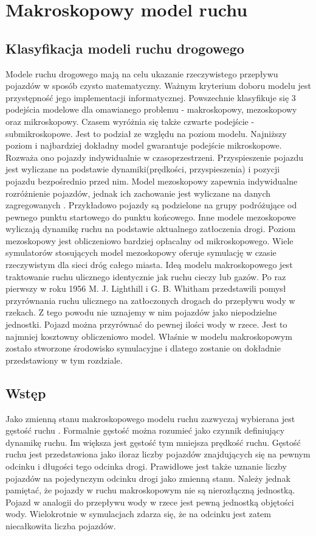 \documentclass[12pt]{book}
\theoremstyle{plain}
\begin{document}
\chapter{Makroskopowy model ruchu} \label{chapter:makroskopowy_model_ruchu}
\section{Klasyfikacja modeli ruchu drogowego}
Modele ruchu drogowego mają na celu ukazanie rzeczywistego przepływu pojazdów w sposób czysto matematyczny. Ważnym kryterium doboru modelu jest przystępność jego implementacji informatycznej. Powszechnie klasyfikuje się 3 podejścia modelowe dla omawianego problemu \cite{CompareModels} - makroskopowy, mezoskopowy oraz mikroskopowy. Czasem \cite{multilevel} wyróżnia się także czwarte podejście - submikroskopowe. Jest to podział ze względu na poziom modelu. Najniższy poziom i najbardziej dokładny model gwarantuje podejście mikroskopowe. Rozważa ono pojazdy indywidualnie w czasoprzestrzeni. Przyspieszenie pojazdu jest wyliczane na podstawie dynamiki(prędkości, przyspieszenia) i pozycji pojazdu bezpośrednio przed nim. Model mezoskopowy zapewnia indywidualne rozróżnienie pojazdów, jednak ich zachowanie jest wyliczane na danych zagregowanych \cite{mesoscopic}. Przykładowo pojazdy są podzielone na grupy podróżujące od pewnego punktu startowego do punktu końcowego. Inne modele \cite{mesoscopic2} mezoskopowe wyliczają dynamikę ruchu na podstawie aktualnego zatłoczenia drogi. Poziom mezoskopowy jest obliczeniowo bardziej opłacalny od mikroskopowego.
Wiele symulatorów stosujących model mezoskopowy oferuje symulację w czasie rzeczywistym dla sieci dróg całego miasta\cite{vu2017high}. Ideą modelu makroskopowego jest traktowanie ruchu ulicznego identycznie jak ruchu cieczy lub gazów. Po raz pierwszy w roku 1956 M. J. Lighthill i G. B. Whitham \cite{lwr} przedstawili pomysł przyrównania ruchu ulicznego na zatłoczonych drogach do przepływu wody w rzekach. Z tego powodu nie uznajemy w nim pojazdów jako niepodzielne jednostki. Pojazd można przyrównać do pewnej ilości wody w rzece.
Jest to najmniej kosztowny obliczeniowo model. Właśnie w modelu makroskopowym zostało stworzone środowisko symulacyjne i dlatego zostanie on dokładnie przedstawiony w tym rozdziale.

\section{Wstęp}
Jako zmienną stanu makroskopowego modelu ruchu zazwyczaj wybierana jest gęstość ruchu \cite{gottlich,CompareModels}. Formalnie gęstość można rozumieć jako czynnik definiujący dynamikę ruchu. Im większa jest gęstość tym mniejsza prędkość ruchu. Gęstość ruchu \cite{helbing2001master} jest przedstawiona jako iloraz liczby pojazdów znajdujących się na pewnym odcinku i długości tego odcinka drogi. Prawidłowe jest także uznanie liczby pojazdów na pojedynczym odcinku drogi jako zmienną stanu. Należy jednak pamiętać, że pojazdy w ruchu makroskopowym nie są nierozłączną jednostką. Pojazd w analogii do przepływu wody w rzece jest pewną jednostką objętości wody. Wielokrotnie w symulacjach zdarza się, że na odcinku jest zatem niecałkowita liczba pojazdów.
\end{document}
